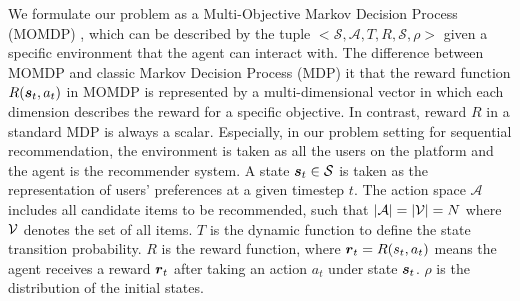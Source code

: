 We formulate our problem as a Multi-Objective Markov Decision Process (MOMDP) \cite{roijers2013survey}, which can be described by the tuple $<\mathcal{S}, \mathcal{A}, T, R,\mathcal{S}, \rho>$ given a specific environment that the agent can interact with. The difference between MOMDP and classic Markov Decision Process (MDP) it that the reward function $R(\boldsymbol{s}_t, a_t)$ in MOMDP is represented by a multi-dimensional vector in which each dimension describes the reward for a specific objective. In contrast, reward $R$ in a standard MDP is always a scalar. Especially, in our problem setting for sequential recommendation, the environment is taken as all the users on the platform and the agent is the recommender system. A state $\boldsymbol{s}_t \in \mathcal{S}$ is taken as the representation of users' preferences at a given timestep $t$. 
The action space $\mathcal{A}$ includes all candidate items to be recommended, such that $|\mathcal{A}|=|\mathcal{V}|=N$ where $\mathcal{V}$ denotes the set of all items. $T$ is the dynamic function to define the state transition probability. $R$ is the reward function, where $\boldsymbol{r}_t=R(s_t, a_t)$ means the agent receives a reward 
$\boldsymbol{r}_t$ after taking an action $a_t$ under state $\boldsymbol{s}_t$. $\rho$ is the distribution of the initial states.


